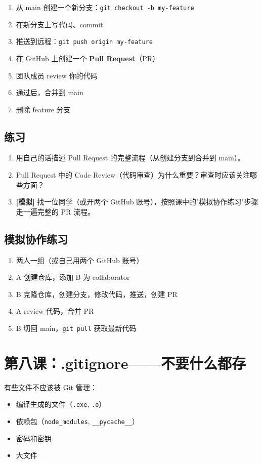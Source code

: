\documentclass[a4paper,12pt]{ctexart}
\begin{document}
\begin{enumerate}
  \item 从 main 创建一个新分支：\texttt{git checkout -b my-feature}
  \item 在新分支上写代码、commit
  \item 推送到远程：\texttt{git push origin my-feature}
  \item 在 GitHub 上创建一个 \textbf{Pull Request}（PR）
  \item 团队成员 review 你的代码
  \item 通过后，合并到 main
  \item 删除 feature 分支
\end{enumerate}

\subsection*{练习}

\begin{enumerate}
  \item 用自己的话描述 Pull Request 的完整流程（从创建分支到合并到 main）。
  \item Pull Request 中的 Code Review（代码审查）为什么重要？审查时应该关注哪些方面？
  \item \textbf{[模拟]} 找一位同学（或开两个 GitHub 账号），按照课中的"模拟协作练习"步骤走一遍完整的 PR 流程。
\end{enumerate}

\subsection*{模拟协作练习}

\begin{enumerate}
  \item 两人一组（或自己用两个 GitHub 账号）
  \item A 创建仓库，添加 B 为 collaborator
  \item B 克隆仓库，创建分支，修改代码，推送，创建 PR
  \item A review 代码，合并 PR
  \item B 切回 main，\texttt{git pull} 获取最新代码
\end{enumerate}

\section*{第八课：.gitignore——不要什么都存}

有些文件不应该被 Git 管理：
\begin{itemize}
  \item 编译生成的文件（\texttt{.exe}, \texttt{.o}）
  \item 依赖包（\texttt{node\_modules}, \texttt{\_\_pycache\_\_}）
  \item 密码和密钥
  \item 大文件
\end{itemize}
\end{document}
